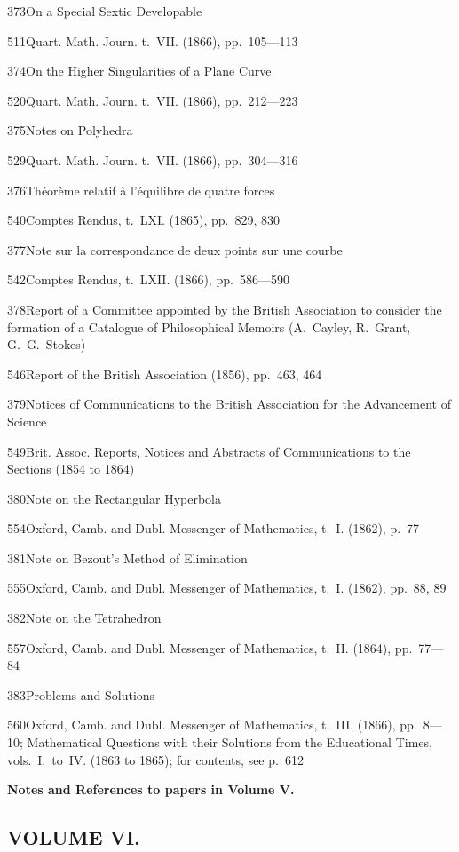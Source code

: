 \documentclass[11pt,a4paper]{book}
\providecommand{\tocentry}[2]{#1\dotfill #2\par}
\begin{document}
\tocentry{373}{On a Special Sextic Developable}{511}{Quart. Math. Journ. t.~VII. (1866), pp.~105---113}

\tocentry{374}{On the Higher Singularities of a Plane Curve}{520}{Quart. Math. Journ. t.~VII. (1866), pp.~212---223}

\tocentry{375}{Notes on Polyhedra}{529}{Quart. Math. Journ. t.~VII. (1866), pp.~304---316}

\tocentry{376}{Th\'{e}or\`{e}me relatif \`{a} l'\'{e}quilibre de quatre forces}{540}{Comptes Rendus, t.~LXI. (1865), pp.~829, 830}

\tocentry{377}{Note sur la correspondance de deux points sur une courbe}{542}{Comptes Rendus, t.~LXII. (1866), pp.~586---590}

\tocentry{378}{Report of a Committee appointed by the British Association to consider the formation of a Catalogue of Philosophical Memoirs (A.~Cayley, R.~Grant, G.~G.~Stokes)}{546}{Report of the British Association (1856), pp.~463, 464}

\tocentry{379}{Notices of Communications to the British Association for the Advancement of Science}{549}{Brit. Assoc. Reports, Notices and Abstracts of Communications to the Sections (1854 to 1864)}

\tocentry{380}{Note on the Rectangular Hyperbola}{554}{Oxford, Camb. and Dubl. Messenger of Mathematics, t.~I. (1862), p.~77}

\tocentry{381}{Note on Bezout's Method of Elimination}{555}{Oxford, Camb. and Dubl. Messenger of Mathematics, t.~I. (1862), pp.~88, 89}

\tocentry{382}{Note on the Tetrahedron}{557}{Oxford, Camb. and Dubl. Messenger of Mathematics, t.~II. (1864), pp.~77---84}

\tocentry{383}{Problems and Solutions}{560}{Oxford, Camb. and Dubl. Messenger of Mathematics, t.~III. (1866), pp.~8---10; Mathematical Questions with their Solutions from the Educational Times, vols.~I.~to~IV. (1863 to 1865); for contents, see p.~612}

\vspace{1cm}
\noindent\textbf{Notes and References to papers in Volume V.} 

\newpage

\subsection*{VOLUME VI.}
\end{document}
